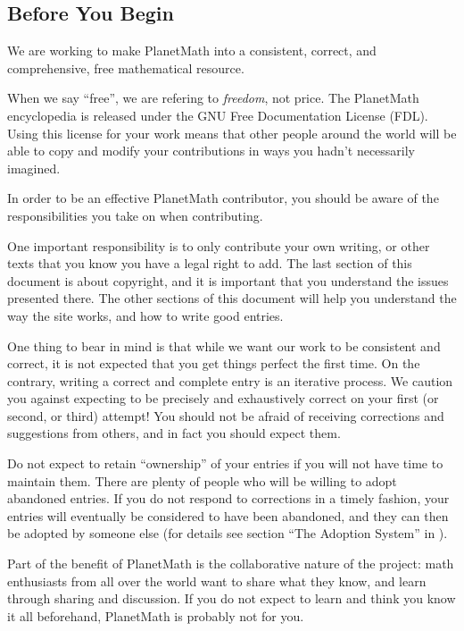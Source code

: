 \subsection*{Before You Begin}
We are working to make PlanetMath into a consistent, correct, and
comprehensive, free mathematical resource.

When we say ``free'', we are refering to \emph{freedom}, not price.
The PlanetMath encyclopedia is released under the GNU Free
Documentation License (FDL). Using this license for your work means that
other people around the world will be able to copy and modify your
contributions in ways you hadn't necessarily imagined.

In order to be an effective PlanetMath contributor, you should be
aware of the responsibilities you take on when contributing.

One important responsibility is to only contribute your own writing,
or other texts that you know you have a legal right to add. The last
section of this document is about copyright, and it is important that
you understand the issues presented there. The other sections of this
document will help you understand the way the site works, and how to
write good entries.

One thing to bear in mind is that while we want our work to be
consistent and correct, it is not expected that you get things perfect
the first time. On the contrary, writing a correct and complete entry
is an iterative process. We caution you against expecting to be
precisely and exhaustively correct on your first (or second, or third)
attempt! You should not be afraid of receiving corrections and
suggestions from others, and in fact you should expect them.

Do not expect to retain ``ownership'' of your entries if you will not
have time to maintain them. There are plenty of people who will be
willing to adopt abandoned entries. If you do not respond to
corrections in a timely fashion, your entries will eventually be
considered to have been abandoned, and they can then be adopted by
someone else
(for details see
section ``The Adoption System'' in
).

Part of the benefit of PlanetMath is the collaborative nature of the
project: math enthusiasts from all over the world want to share what
they know, and learn through sharing and discussion. If you do not
expect to learn and think you know it all beforehand, PlanetMath is
probably not for you.


